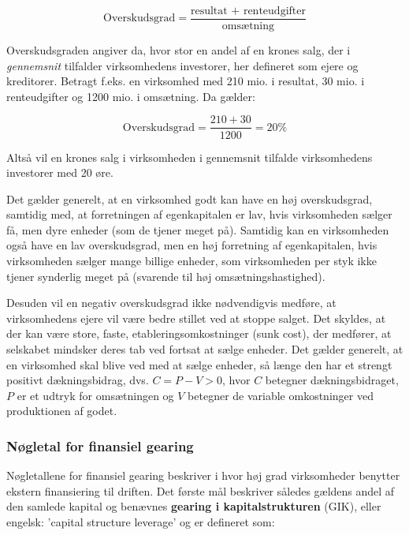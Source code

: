 \documentclass[10pt,reqno, usenames]{article}
\begin{document}
\begin{equation}
    \text{Overskudsgrad} = \frac{\text{resultat + renteudgifter}}{\text{omsætning}}
\end{equation}

Overskudsgraden angiver da, hvor stor en andel af en krones salg, der i \textit{gennemsnit} tilfalder virksomhedens investorer, her defineret som ejere og kreditorer. Betragt f.eks. en virksomhed med 210 mio. i resultat, 30 mio. i renteudgifter og 1200 mio. i omsætning. Da gælder: 

\begin{equation}
    \text{Overskudsgrad} = \frac{210+30}{1200} = 20 \% \nonumber
\end{equation}

Altså vil en krones salg i virksomheden i gennemsnit tilfalde virksomhedens investorer med 20 øre. 

\vspace{1.5 pt}

\hspace{5 pt} Det gælder generelt, at en virksomhed godt kan have en høj overskudsgrad, samtidig med, at forretningen af egenkapitalen er lav, hvis virksomheden sælger få, men dyre enheder (som de tjener meget på). Samtidig kan en virksomheden også have en lav overskudsgrad, men en høj forretning af egenkapitalen, hvis virksomheden sælger mange billige enheder, som virksomheden per styk ikke tjener synderlig meget på (svarende til høj omsætningshastighed). 

\vspace{10 pt}

Desuden vil en negativ overskudsgrad ikke nødvendigvis medføre, at virksomhedens ejere vil være bedre stillet ved at stoppe salget. Det skyldes, at der kan være store, faste, etableringsomkostninger (sunk cost), der medfører, at selskabet mindsker deres tab ved fortsat at sælge enheder. Det gælder generelt, at en virksomhed skal blive ved med at sælge enheder, så længe den har et strengt positivt dækningsbidrag, dvs. $C = P - V > 0$, hvor $C$ betegner dækningsbidraget, $P$ er et udtryk for omsætningen og $V$ betegner de variable omkostninger ved produktionen af godet. 

\subsubsection{Nøgletal for finansiel gearing}
Nøgletallene for finansiel gearing beskriver i hvor høj grad virksomheder benytter ekstern finansiering til driften. Det første mål beskriver således gældens andel af den samlede kapital og benævnes \textbf{gearing i kapitalstrukturen} (GIK), eller engelsk: 'capital structure leverage' og er defineret som: 
\end{document}
